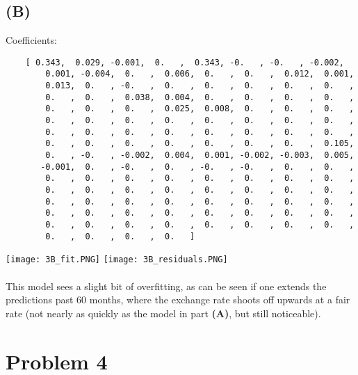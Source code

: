 \documentclass[12pt]{article}
\begin{document}
\subsection*{(B)}
Coefficients:
\begin{verbatim}
    [ 0.343,  0.029, -0.001,  0.   ,  0.343, -0.   , -0.   , -0.002,
        0.001, -0.004,  0.   ,  0.006,  0.   ,  0.   ,  0.012,  0.001,
        0.013,  0.   , -0.   ,  0.   ,  0.   ,  0.   ,  0.   ,  0.   ,
        0.   ,  0.   ,  0.038,  0.004,  0.   ,  0.   ,  0.   ,  0.   ,
        0.   ,  0.   ,  0.   ,  0.025,  0.008,  0.   ,  0.   ,  0.   ,
        0.   ,  0.   ,  0.   ,  0.   ,  0.   ,  0.   ,  0.   ,  0.   ,
        0.   ,  0.   ,  0.   ,  0.   ,  0.   ,  0.   ,  0.   ,  0.   ,
        0.   ,  0.   ,  0.   ,  0.   ,  0.   ,  0.   ,  0.   ,  0.105,
        0.   , -0.   , -0.002,  0.004,  0.001, -0.002, -0.003,  0.005,
       -0.001,  0.   , -0.   ,  0.   , -0.   , -0.   ,  0.   ,  0.   ,
        0.   ,  0.   ,  0.   ,  0.   ,  0.   ,  0.   ,  0.   ,  0.   ,
        0.   ,  0.   ,  0.   ,  0.   ,  0.   ,  0.   ,  0.   ,  0.   ,
        0.   ,  0.   ,  0.   ,  0.   ,  0.   ,  0.   ,  0.   ,  0.   ,
        0.   ,  0.   ,  0.   ,  0.   ,  0.   ,  0.   ,  0.   ,  0.   ,
        0.   ,  0.   ,  0.   ,  0.   ,  0.   ,  0.   ,  0.   ,  0.   ,
        0.   ,  0.   ,  0.   ,  0.   ]
\end{verbatim}

\texttt{[image: 3B\_fit.PNG]}
\texttt{[image: 3B\_residuals.PNG]}
\\
\\
This model sees a slight bit of overfitting, as can be seen if one extends the predictions past 60 months, where the exchange rate shoots off upwards at a fair rate (not nearly as quickly as the model in part \textbf{(A)}, but still noticeable).

\newpage
\section*{Problem 4}
\end{document}
